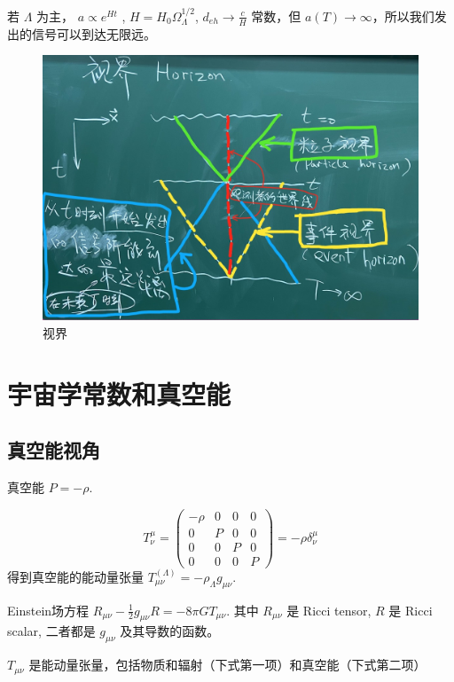 \documentclass[]{ctexart}
\begin{document}
若 $\Lambda$ 为主， $a\propto e^{Ht}$ , $H=H_0 \Omega_\Lambda^{1/2}$,  $d_{eh}\to \frac{c}{H}$ 常数，但 $a(T)\to \infty$，所以我们发出的信号可以到达无限远。 

\begin{figure}[!hbtp]
	\centering
	\includegraphics[width=1.0\linewidth]{horizon.jpg}
	\caption{视界}
\end{figure}


\section{宇宙学常数和真空能}

\subsection{真空能视角}
真空能 $P=-\rho$.

\begin{equation} 
    T^\mu_{\nu} = \left(\begin{array}{llll}-\rho & 0 & 0 & 0 \\ 0 & P & 0 & 0 \\ 0& 0& P &0 \\ 0 & 0&0&P\end{array}\right) = -\rho \delta^\mu_{\nu}
\end{equation}
得到真空能的能动量张量 $T_{\mu\nu}^{(\Lambda)}=- \rho_\Lambda g_{\mu\nu}$.

Einstein场方程 $R_{\mu\nu} - \frac{1}{2} g_{\mu\nu} R = -8\pi G T_{\mu\nu}$.
其中 $R_{\mu\nu}$ 是 Ricci tensor,  $R$ 是 Ricci scalar, 二者都是  $g_{\mu\nu}$ 及其导数的函数。

$T_{\mu\nu}$ 是能动量张量，包括物质和辐射（下式第一项）和真空能（下式第二项）
\end{document}
